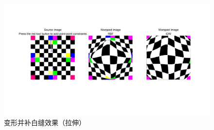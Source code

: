 \documentclass[a4paper]{ltxdoc}
\begin{document}
\begin{figure}[htb]
  \centering
  \includegraphics[width=1.0\textwidth]{fig22.jpg}
  \caption{变形并补白缝效果（拉伸）}
  \label{fig:fig-4}
\end{figure}
\end{document}
